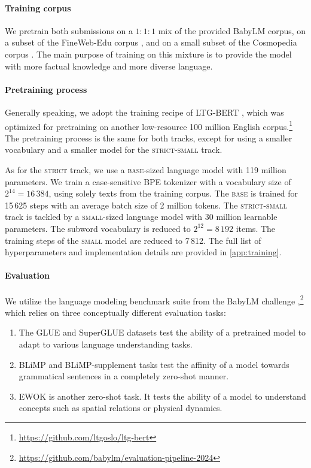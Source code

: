 \paragraph{Training corpus} We pretrain both submissions on a $1:1:1$ mix of the provided BabyLM corpus, on a subset of the FineWeb-Edu corpus \citep{lozhkov2024fineweb-edu}, and on a small subset of the Cosmopedia corpus \citep{benallal2024cosmopedia}. The main purpose of training on this mixture is to provide the model with more factual knowledge and more diverse language. 

\paragraph{Pretraining process} Generally speaking, we adopt the training recipe of LTG-BERT \citep{samuel-etal-2023-trained}, which was optimized for pretraining on another low-resource 100 million English corpus.\footnote{\url{https://github.com/ltgoslo/ltg-bert}} The pretraining process is the same for both tracks, except for using a smaller vocabulary and a smaller model for the \textsc{strict-small} track.

As for the \textsc{strict} track, we use a \textsc{base}-sized language model with 119 million parameters. We train a case-sensitive BPE tokenizer \citep{Gage1994ANA} with a vocabulary size of $2^{14} = 16\,384$, using solely texts from the training corpus. The \textsc{base} is trained for 15\,625 steps with an average batch size of 2 million tokens. The \textsc{strict-small} track is tackled by a \textsc{small}-sized language model with 30 million learnable parameters. The subword vocabulary is reduced to $2^{12} = 8\,192$ items. The training steps of the \textsc{small} model are reduced to 7\,812. The full list of hyperparameters and implementation details are provided in \cref{app:training}.

\paragraph{Evaluation}
\label{sec:evaluation}

We utilize the language modeling benchmark suite from the BabyLM challenge \citep{eval-harness, babylm-2024},\footnote{\url{https://github.com/babylm/evaluation-pipeline-2024}} which relies on three conceptually different evaluation tasks:
\begin{enumerate}
    \item The GLUE and SuperGLUE datasets test the ability of a pretrained model to adapt to various language understanding tasks.
    \item BLiMP and BLiMP-supplement tasks test the affinity of a model towards grammatical sentences in a completely zero-shot manner.
    \item EWOK is another zero-shot task. It tests the ability of a model to understand concepts such as spatial relations or physical dynamics.
\end{enumerate}

